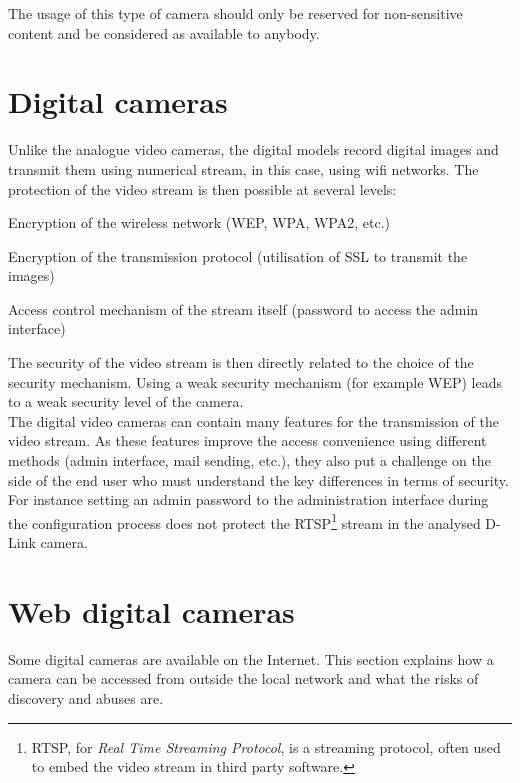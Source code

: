 The usage of this type of camera should only be reserved for non-sensitive content and be considered as available to anybody.

\section{Digital cameras}
\label{sec:cam-digital}

Unlike the analogue video cameras, the digital models record digital images and transmit them using numerical stream, in this case, using wifi networks.
The protection of the video stream is then possible at several levels:\\

\begin{itemizealt}
\item Encryption of the wireless network (WEP, WPA, WPA2, etc.)
\item Encryption of the transmission protocol (utilisation of SSL to transmit the images)
\item Access control mechanism of the stream itself (password to access the admin interface)
\end{itemizealt}

The security of the video stream is then directly related to the choice of the security mechanism.
Using a weak security mechanism (for example WEP) leads to a weak security level of the camera.\\

The digital video cameras can contain many features for the transmission of the video stream.
As these features improve the access convenience using different methods (admin interface, mail sending, etc.), they also put a challenge on the side of the end user who must understand the key differences in terms of security.
For instance setting an admin password to the administration interface during the configuration process does not protect the RTSP\footnote{RTSP, for \emph{Real Time Streaming Protocol}, is a streaming protocol, often used to embed the video stream in third party software.} stream in the analysed D-Link camera.

\section{Web digital cameras}
\label{sec:cam-google}

Some digital cameras are available on the Internet.
This section explains how a camera can be accessed from outside the local network and what the risks of discovery and abuses are.

